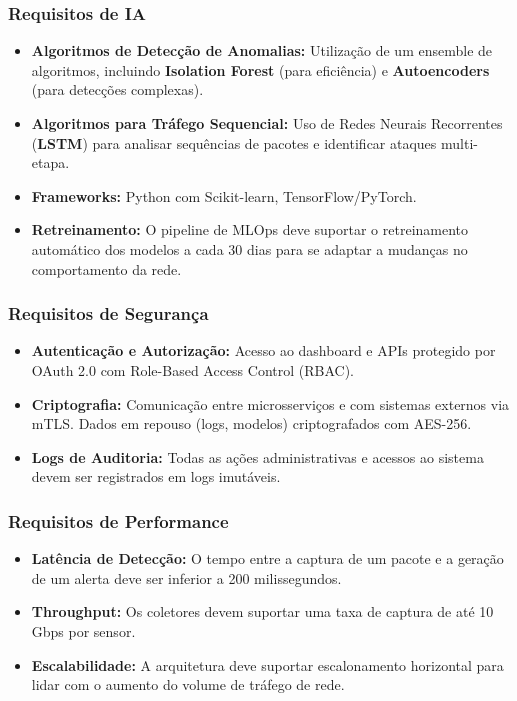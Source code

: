 \documentclass[a4paper,12pt]{article}
\begin{document}
\subsubsection{Requisitos de IA}
\begin{itemize}
    \item \textbf{Algoritmos de Detecção de Anomalias:} Utilização de um ensemble de algoritmos, incluindo \textbf{Isolation Forest} (para eficiência) e \textbf{Autoencoders} (para detecções complexas).
    \item \textbf{Algoritmos para Tráfego Sequencial:} Uso de Redes Neurais Recorrentes (\textbf{LSTM}) para analisar sequências de pacotes e identificar ataques multi-etapa.
    \item \textbf{Frameworks:} Python com Scikit-learn, TensorFlow/PyTorch.
    \item \textbf{Retreinamento:} O pipeline de MLOps deve suportar o retreinamento automático dos modelos a cada 30 dias para se adaptar a mudanças no comportamento da rede.
\end{itemize}

\subsubsection{Requisitos de Segurança}
\begin{itemize}
    \item \textbf{Autenticação e Autorização:} Acesso ao dashboard e APIs protegido por OAuth 2.0 com Role-Based Access Control (RBAC).
    \item \textbf{Criptografia:} Comunicação entre microsserviços e com sistemas externos via mTLS. Dados em repouso (logs, modelos) criptografados com AES-256.
    \item \textbf{Logs de Auditoria:} Todas as ações administrativas e acessos ao sistema devem ser registrados em logs imutáveis.
\end{itemize}

\subsubsection{Requisitos de Performance}
\begin{itemize}
    \item \textbf{Latência de Detecção:} O tempo entre a captura de um pacote e a geração de um alerta deve ser inferior a 200 milissegundos.
    \item \textbf{Throughput:} Os coletores devem suportar uma taxa de captura de até 10 Gbps por sensor.
    \item \textbf{Escalabilidade:} A arquitetura deve suportar escalonamento horizontal para lidar com o aumento do volume de tráfego de rede.
\end{itemize}
\end{document}
